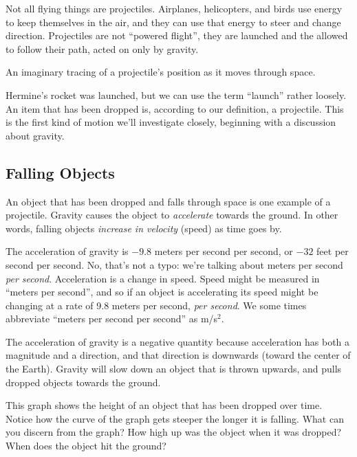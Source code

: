 Not all flying things are projectiles. Airplanes, helicopters, and birds use energy to keep themselves in the air, and they can use that energy to steer and change direction. Projectiles are not ``powered flight'', they are launched and the allowed to follow their path, acted on only by gravity.

\begin{boxeddef}[Trajectory]
An imaginary tracing of a projectile's position as it moves through space.
\end{boxeddef}

Hermine's rocket was launched, but we can use the term ``launch'' rather loosely. An item that has been dropped is, according to our definition, a projectile. This is the first kind of motion we'll investigate closely, beginning with a discussion about gravity.

\subsection{Falling Objects}

An object that has been dropped and falls through space is one example of a projectile. Gravity causes the object to \textit{accelerate} towards the ground. In other words, falling objects \textit{increase in velocity} (speed) as time goes by.

The acceleration of gravity is $-9.8$ meters per second per second, or $-32$ feet per second per second. No, that's not a typo: we're talking about meters per second \textit{per second}. Acceleration is a change in speed. Speed might be measured in ``meters per second'', and so if an object is accelerating its speed might be changing at a rate of 9.8 meters per second, \textit{per second}. We some times abbreviate ``meters per second per second'' as m/s$^2$.

The acceleration of gravity is a negative quantity because acceleration has both a magnitude and a direction, and that direction is downwards (toward the center of the Earth). Gravity will slow down an object that is thrown upwards, and pulls dropped objects towards the ground.

This graph shows the height of an object that has been dropped over time. Notice how the curve of the graph gets steeper the longer it is falling. What can you discern from the graph? How high up was the object when it was dropped? When does the object hit the ground?

\begin{figure}
\end{figure}


